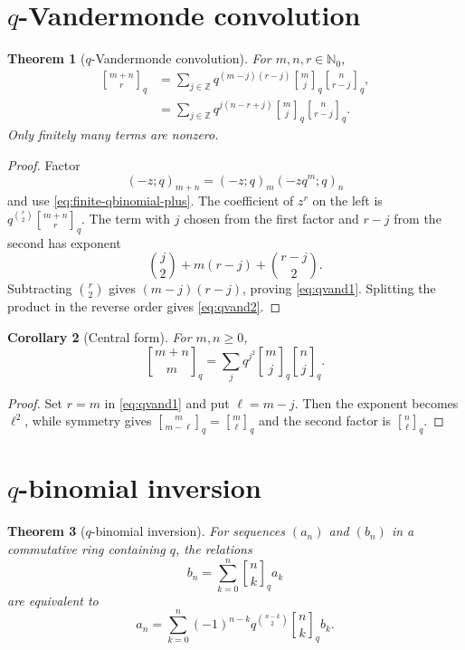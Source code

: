 \documentclass[11pt,oneside,openany]{book}
\newtheorem{theorem}{Theorem}[chapter]
\newtheorem{corollary}[theorem]{Corollary}
\theoremstyle{definition}
\theoremstyle{remark}
\newcommand{\qbinom}[2]{\genfrac{[}{]}{0pt}{}{#1}{#2}_{q}}
\newcommand{\Z}{\mathbb Z}
\newcommand{\N}{\mathbb N}
\begin{document}
\section{\texorpdfstring{$q$}{q}-Vandermonde convolution}

\begin{theorem}[$q$-Vandermonde convolution]\label{thm:q-vandermonde}
For $m,n,r\in\N_0$,
\begin{align}
 \qbinom{m+n}{r}
 &=\sum_{j\in\Z}q^{(m-j)(r-j)}
 \qbinom mj\qbinom n{r-j},\label{eq:qvand1}\\
 &=\sum_{j\in\Z}q^{j(n-r+j)}
 \qbinom mj\qbinom n{r-j}.\label{eq:qvand2}
\end{align}
Only finitely many terms are nonzero.
\end{theorem}

\begin{proof}
Factor
\[
 (-z;q)_{m+n}=(-z;q)_m(-zq^m;q)_n
\]
and use \eqref{eq:finite-qbinomial-plus}.  The coefficient of $z^r$ on the left is
\(
 q^{\binom r2}\qbinom{m+n}{r}.
\)
The term with $j$ chosen from the first factor and $r-j$ from the second has exponent
\[
 \binom j2+m(r-j)+\binom{r-j}{2}.
\]
Subtracting $\binom r2$ gives $(m-j)(r-j)$, proving \eqref{eq:qvand1}.  Splitting the product in the reverse order gives \eqref{eq:qvand2}.
\end{proof}

\begin{corollary}[Central form]\label{cor:central-vandermonde}
For $m,n\ge0$,
\[
 \qbinom{m+n}{m}
 =\sum_j q^{j^2}\qbinom mj\qbinom n j.
\]
\end{corollary}

\begin{proof}
Set $r=m$ in \eqref{eq:qvand1} and put $\ell=m-j$.  Then the exponent becomes $\ell^2$, while symmetry gives $\qbinom m{m-\ell}=\qbinom m\ell$ and the second factor is $\qbinom n\ell$.
\end{proof}

\section{\texorpdfstring{$q$}{q}-binomial inversion}

\begin{theorem}[$q$-binomial inversion]\label{thm:qbinomial-inversion}
For sequences $(a_n)$ and $(b_n)$ in a commutative ring containing $q$, the relations
\[
 b_n=\sum_{k=0}^{n}\qbinom nk a_k
\]
are equivalent to
\[
 a_n=\sum_{k=0}^{n}(-1)^{n-k}q^{\binom{n-k}{2}}\qbinom nk b_k.
\]
\end{theorem}
\end{document}
